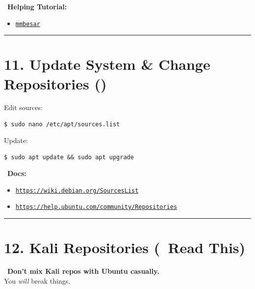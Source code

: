 \documentclass[12pt]{article}
\newcommand{\repoicon}{\faBox}
\newcommand{\warningicon}{\faExclamationTriangle}
\newcommand{\bookicon}{\faBook}
\newcommand{\computericon}{\faDesktop}
\begin{document}
\begin{infobox}
\computericon\ \textbf{Helping Tutorial:}
\begin{itemize}
    \item \href{https://mmbesar.github.io/Tutorials/appimages/}{\texttt{mmbesar}}
\end{itemize}
\end{infobox}

\vspace{1em}
\begin{center}
\color{teamred}\rule{0.8\textwidth}{1pt}
\end{center}

\section*{11. Update System \& Change Repositories (\repoicon)}

Edit sources:

\begin{highlightbox}
\texttt{\$ sudo nano /etc/apt/sources.list}
\end{highlightbox}

Update:

\begin{highlightbox}
\texttt{\$ sudo apt update \&\& sudo apt upgrade}
\end{highlightbox}

\begin{infobox}
\bookicon\ \textbf{Docs:}
\begin{itemize}
    \item \href{https://wiki.debian.org/SourcesList}{\texttt{https://wiki.debian.org/SourcesList}}
    \item \href{https://help.ubuntu.com/community/Repositories}{\texttt{https://help.ubuntu.com/community/Repositories}}
\end{itemize}
\end{infobox}

\vspace{1em}
\begin{center}
\color{teamred}\rule{0.8\textwidth}{1pt}
\end{center}

\section*{12. Kali Repositories (\warningicon\ Read This)}

\begin{warningbox}
\warningicon\ \textbf{Don't mix Kali repos with Ubuntu casually.}\\
You \textit{will} break things.
\end{warningbox}
\end{document}
